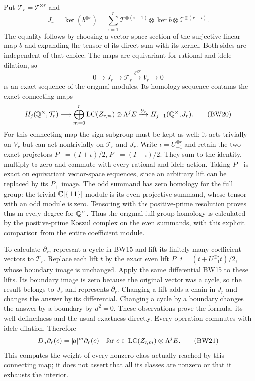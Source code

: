 Put $\mathcal T_r=\mathcal T^{\otimes r}$ and
\[
 J_r=\ker(b^{\otimes r})
 =\sum_{i=1}^r\mathcal T^{\otimes(i-1)}\otimes\ker b
                    \otimes\mathcal T^{\otimes(r-i)}.
 \tag{BW18}
\]
The equality follows by choosing a vector-space section of the
surjective linear map $b$ and expanding the tensor of its direct
sum with its kernel. Both sides are independent of that choice.
The maps are equivariant for rational and idele dilation, so
\[
 0\longrightarrow J_r\longrightarrow\mathcal T_r
       \xrightarrow{b^{\otimes r}}V_r\longrightarrow0
 \tag{BW19}
\]
is an exact sequence of the original modules. Its homology sequence
contains the exact connecting maps
\[
 H_j(\mathbb Q^\times,\mathcal T_r)\longrightarrow
 \bigoplus_{m=0}^r\operatorname{LC}(Z_{r,m})\otimes\Lambda^jE
 \xrightarrow{\partial_r}H_{j-1}(\mathbb Q^\times,J_r).
 \tag{BW20}
\]
For this connecting map the sign subgroup must be kept as well:
it acts trivially on $V_r$ but can act nontrivially on
$\mathcal T_r$ and $J_r$. Write $\iota=U_{-1}^{\otimes r}$ and
retain the two exact projectors
$P_+=(I+\iota)/2$, $P_-=(I-\iota)/2$.
They sum to the identity, multiply to zero and commute with
every rational and idele action. Taking $P_+$ is exact on
equivariant vector-space sequences, since an arbitrary lift can
be replaced by its $P_+$ image. The odd summand has zero
homology for the full group: the trivial $\mathbb C[\{\pm1\}]$ module
is its even projective summand, whose tensor with an odd module
is zero. Tensoring with the positive-prime resolution proves
this in every degree for $\mathbb Q^\times$.
Thus the original full-group homology is calculated by the
positive-prime Koszul complex on the even summands, with this
explicit comparison from the entire coefficient module.

To calculate $\partial_r$, represent a cycle in BW15 and lift
its finitely many coefficient vectors to $\mathcal T_r$.
Replace each lift $t$ by the exact even lift
$P_+t=(t+U_{-1}^{\otimes r}t)/2$, whose boundary image is unchanged.
Apply the same differential BW15 to these lifts.
Its boundary image is zero because the original vector was a
cycle, so the result belongs to $J_r$ and represents
$\partial_r$. Changing a lift adds a chain in $J_r$ and changes
the answer by its differential. Changing a cycle by a boundary
changes the answer by a boundary by $d^2=0$. These observations
prove the formula, its well-definedness and the usual exactness
directly. Every operation commutes with idele dilation. Therefore
\[
 D_a\partial_r(c)=|a|^m\partial_r(c)
 \quad\text{for }c\in\operatorname{LC}(Z_{r,m})\otimes\Lambda^jE.
 \tag{BW21}
\]
This computes the weight of every nonzero class actually reached
by this connecting map; it does not assert that all its classes
are nonzero or that it exhausts the interior.

